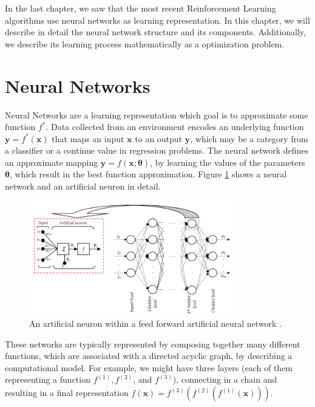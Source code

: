 In the last chapter, we saw that the most recent Reinforcement Learning algorithms use neural networks as learning representation. In this chapter, we will describe in detail the neural network structure and its components. Additionally, we describe its learning process mathematically as a optimization problem.

\section{Neural Networks}
\label{sec:neural_networks}
Neural Networks are a learning representation which goal is to approximate some function \( f^* \). Data collected from an environment encodes an underlying function \( \mathrm{\mathbf{y}} = f^*(\mathrm{\mathbf{x}}) \) that maps an input \( \textbf{x} \) to an output \( \mathrm{\mathbf{y}} \), which may be a category from a classifier or a continue value in regression problems. The neural network defines an approximate mapping \( \mathrm{\mathbf{y}} = f(\mathrm{\mathbf{x}};\boldsymbol{\theta}) \), by learning the values of the parameters \(\boldsymbol{\theta}\), which result in the best function approximation. Figure \ref{fig:ann} shows a neural network and an artificial neuron in detail.

\begin{figure}[!htbp]
\centering
\includegraphics[width=0.8\textwidth]{Cap3/ann}
\caption{An artificial neuron within a feed forward artificial neural network \cite{dejan12}. }
\label{fig:ann}
\end{figure}

These networks are typically represented by composing together many different functions, which are associated with a directed acyclic graph, by describing a computational model. For example, we might have three layers (each of them representing a function \( f^{(1)}, f^{(2)} \), and \(f^{(3)} \)), connecting in a chain and resulting in a final representation \( f(\mathrm{\mathbf{x}}) = f^{(3)}(  f^{(2)} ( f^{(1)}(\mathrm{\mathbf{x}}))) \).

